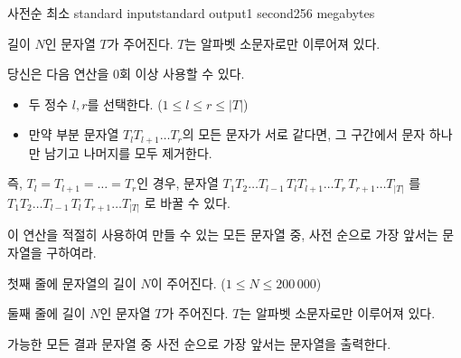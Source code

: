 \begin{problem}{사전순 최소 }{standard input}{standard output}{1 second}{256 megabytes}

길이 $N$인 문자열 $T$가 주어진다. $T$는 알파벳 소문자로만 이루어져 있다.

당신은 다음 연산을 $0$회 이상 사용할 수 있다.

\begin{itemize}
    \item 두 정수 $l, r$를 선택한다. ($1 \le l \le r \le |T|$)
    \item 만약 부분 문자열 $T_l T_{l+1} \dots T_r$의 모든 문자가 서로 같다면, 그 구간에서 문자 하나만 남기고 나머지를 모두 제거한다.
\end{itemize}

즉, $T_l = T_{l+1} = \dots = T_r$인 경우, 문자열
$ T_1 T_2 \dots T_{l-1}\, T_l T_{l+1} \dots T_r\, T_{r+1} \dots T_{|T|} $
를
$ T_1 T_2 \dots T_{l-1}\, T_l\, T_{r+1} \dots T_{|T|} $
로 바꿀 수 있다.

이 연산을 적절히 사용하여 만들 수 있는 모든 문자열 중, 사전 순으로 가장 앞서는 문자열을 구하여라.

\InputFile
첫째 줄에 문자열의 길이 $N$이 주어진다. ($1 \le N \le 200\,000$)

둘째 줄에 길이 $N$인 문자열 $T$가 주어진다. $T$는 알파벳 소문자로만 이루어져 있다.

\OutputFile
가능한 모든 결과 문자열 중 사전 순으로 가장 앞서는 문자열을 출력한다.

\Examples

\begin{example}
%
%
\end{example}

\end{problem}

